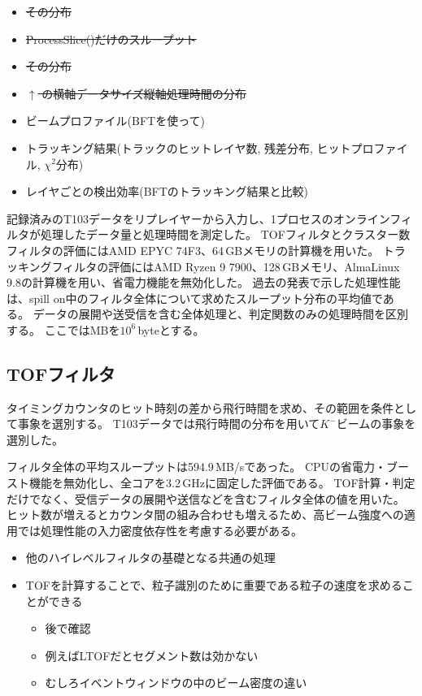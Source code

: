 \documentclass[../main.tex]{subfiles}
\begin{document}
\begin{tcolorbox}
\begin{itemize}
\begin{itemize}
\begin{itemize}
      \item \sout{その分布}
      \item \sout{ProcessSlice()だけのスループット}
      \item \sout{その分布}
      \item \sout{$\uparrow$ の横軸データサイズ縦軸処理時間の分布}
      \item ビームプロファイル(BFTを使って)
      \item トラッキング結果(トラックのヒットレイヤ数, 残差分布, ヒットプロファイル, $\chi^2$分布)
      \item レイヤごとの検出効率(BFTのトラッキング結果と比較)
    \end{itemize}
  \end{itemize}
\end{itemize}
\end{tcolorbox}
記録済みのT103データをリプレイヤーから入力し、1プロセスのオンラインフィルタが処理したデータ量と処理時間を測定した。
TOFフィルタとクラスター数フィルタの評価にはAMD EPYC 74F3、64\,GBメモリの計算機を用いた。
トラッキングフィルタの評価にはAMD Ryzen 9 7900、128\,GBメモリ、AlmaLinux 9.8の計算機を用い、省電力機能を無効化した\cite{kashima:tof2025,kashima:cluster2026,kashima:tracking2026}。
過去の発表で示した処理性能は、spill on中のフィルタ全体について求めたスループット分布の平均値である。
データの展開や送受信を含む全体処理と、判定関数のみの処理時間を区別する。
ここではMBを$10^6$\,byteとする。

\subsection{TOFフィルタ}

タイミングカウンタのヒット時刻の差から飛行時間を求め、その範囲を条件として事象を選別する。
T103データでは飛行時間の分布を用いて$K^{-}$ビームの事象を選別した。


フィルタ全体の平均スループットは594.9\,MB/sであった\cite{kashima:tof2025}。
CPUの省電力・ブースト機能を無効化し、全コアを3.2\,GHzに固定した評価である。
TOF計算・判定だけでなく、受信データの展開や送信などを含むフィルタ全体の値を用いた。
ヒット数が増えるとカウンタ間の組み合わせも増えるため、高ビーム強度への適用では処理性能の入力密度依存性を考慮する必要がある。

\begin{tcolorbox}[
  title=執筆メモ,
  colback=yellow!8,
  colframe=black!30,
  breakable
]
\begin{itemize}
  \item 他のハイレベルフィルタの基礎となる共通の処理
  \item TOFを計算することで、粒子識別のために重要である粒子の速度を求めることができる
  \begin{itemize}
    \item 後で確認
    \item 例えばLTOFだとセグメント数は効かない
    \item むしろイベントウィンドウの中のビーム密度の違い
  \end{itemize}
\end{itemize}
\end{tcolorbox}
\end{document}
